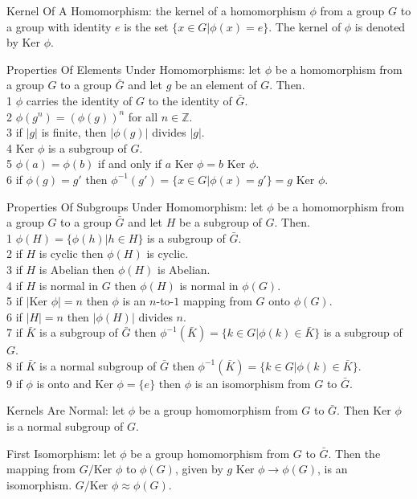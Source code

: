 Kernel Of A Homomorphism: the kernel of a homomorphism $\phi$ from a group $G$ to a group with identity $e$ is the set $\{ x \in G | \phi (x)=e \}$. The kernel of $\phi$ is denoted by $\text{Ker } \phi$.

Properties Of Elements Under Homomorphisms: let $\phi$ be a homomorphism from a group $G$ to a group $\bar{G}$ and let $g$ be an element of $G$. Then. \\
1 $\phi$ carries the identity of $G$ to the identity of $\bar{G}$. \\
2 $\phi (g^n) = (\phi (g))^n$ for all $n \in \mathbb{Z}$. \\
3 if $|g|$ is finite, then $|\phi (g)|$ divides $|g|$. \\
4 $\text{Ker } \phi$ is a subgroup of $G$. \\
5 $\phi (a)=\phi (b)$ if and only if $a\text{ Ker }\phi = b\text{ Ker }\phi$. \\
6 if $\phi (g)=g'$ then $\phi^{-1} (g') = \{ x \in G | \phi (x)=g' \} = g \text{ Ker }\phi$.

Properties Of Subgroups Under Homomorphism: let $\phi$ be a homomorphism from a group $G$ to a group $\bar{G}$ and let $H$ be a subgroup of $G$. Then. \\
1 $\phi (H) = \{\phi (h) | h \in H \}$ is a subgroup of $\bar{G}$. \\
2 if $H$ is cyclic then $\phi (H)$ is cyclic. \\
3 if $H$ is Abelian then $\phi (H)$ is Abelian. \\
4 if $H$ is normal in $G$ then $\phi (H)$ is normal in $\phi (G)$. \\
5 if $|\text{Ker }\phi|=n$ then $\phi$ is an $n$-to-$1$ mapping from $G$ onto $\phi (G)$. \\
6 if $|H|=n$ then $|\phi (H)|$ divides $n$. \\
7 if $\bar{K}$ is a subgroup of $\bar{G}$ then $\phi^{-1} (\bar{K}) = \{k \in G | \phi (k) \in \bar{K} \}$ is a subgroup of $G$. \\
8 if $\bar{K}$ is a normal subgroup of $\bar{G}$ then $\phi^{-1} (\bar{K}) = \{k \in G | \phi (k) \in \bar{K} \}$. \\
9 if $\phi$ is onto and $\text{Ker }\phi = \{ e \}$ then $\phi$ is an isomorphism from $G$ to $\bar{G}$.

Kernels Are Normal: let $\phi$ be a group homomorphism from $G$ to $\bar{G}$. Then $\text{Ker }\phi$ is a normal subgroup of $G$.

First Isomorphism: let $\phi$ be a group homomorphism from $G$ to $\bar{G}$. Then the mapping from $G/\text{Ker }\phi$ to $\phi (G)$, given by $g\text{ Ker }\phi \to \phi (G)$, is an isomorphism. $G/\text{Ker }\phi \approx \phi (G)$.

